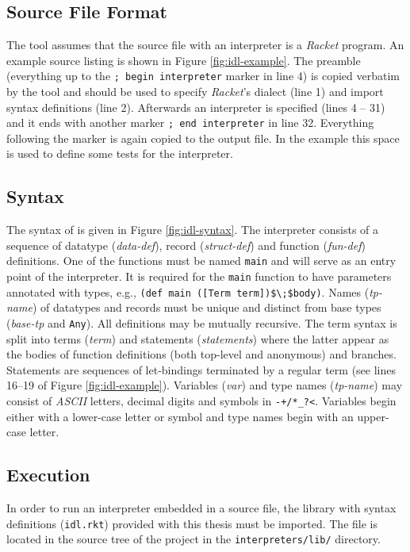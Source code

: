 \subsection*{Source File Format}
The tool assumes that the source file with an interpreter is a \textit{Racket} program.
An example source listing is shown in Figure \ref{fig:idl-example}.
The preamble (everything up to the \lstinline!; begin interpreter! marker in line 4) is copied verbatim by the tool and should be used to specify \emph{Racket}'s dialect (line 1) and import syntax definitions (line 2).
Afterwards an interpreter is specified (lines 4 -- 31) and it ends with another marker \lstinline!; end interpreter! in line 32.
Everything following the marker is again copied to the output file.
In the example this space is used to define some tests for the interpreter.

\subsection*{Syntax}
The syntax of \IDL{} is given in Figure \ref{fig:idl-syntax}.
The interpreter consists of a sequence of datatype (\textit{data-def}), record (\textit{struct-def}) and function (\textit{fun-def}) definitions.
One of the functions must be named \lstinline!main! and will serve as an entry point of the interpreter.
It is required for the \lstinline!main! function to have parameters annotated with types, e.g., \lstinline!(def main ([Term term])$\;$body)!.
Names (\textit{tp-name}) of datatypes and records must be unique and distinct from base types (\textit{base-tp} and \lstinline!Any!).
All definitions may be mutually recursive.
The term syntax is split into terms (\textit{term}) and statements (\textit{statements}) where the latter appear as the bodies of function definitions (both top-level and anonymous) and branches.
Statements are sequences of let-bindings terminated by a regular term (see lines 16--19 of Figure \ref{fig:idl-example}).
Variables (\textit{var}) and type names (\textit{tp-name}) may consist of \textit{ASCII} letters, decimal digits and symbols in \lstinline!-+/*_?<!.
Variables begin either with a lower-case letter or symbol and type names begin with an upper-case letter.

\subsection*{Execution}
In order to run an interpreter embedded in a source file, the library with syntax definitions (\lstinline!idl.rkt!) provided with this thesis must be imported.
The file is located in the source tree of the project in the \lstinline!interpreters/lib/! directory.

